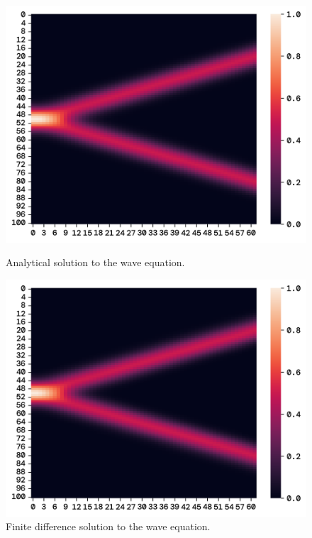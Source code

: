 \documentclass[twoside,11pt]{report}
\begin{document}
    \begin{figure}[!ht]
        \begin{minipage}[t]{0.5\textwidth - 1mm}
            \begin{center}
                \includegraphics[width=\textwidth]{../runsAndFigures/wave_analytic.png}
            \end{center}
            \caption
            {
                Analytical solution to the wave equation.
            }\label{fig:wave_finite}
        \end{minipage}
        \hspace{2mm}
        \begin{minipage}[t]{0.5\textwidth - 1mm}
            \begin{center}
                \includegraphics[width=\textwidth]{../runsAndFigures/wave_finite.png}
            \end{center}
            \caption
            {
                Finite difference solution to the wave equation.
            }\label{fig:wave_analytic}
        \end{minipage}
    \end{figure}
\end{document}
